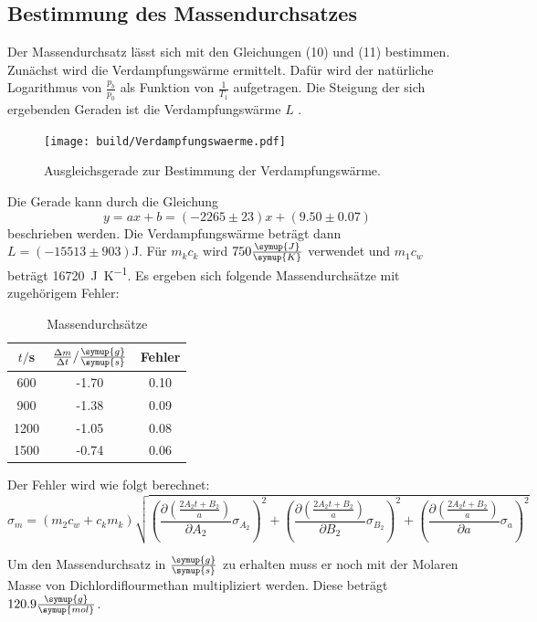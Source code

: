 \subsection{Bestimmung des Massendurchsatzes}
Der Massendurchsatz lässt sich mit den Gleichungen (10) und (11) bestimmen. Zunächst
wird die Verdampfungswärme ermittelt. Dafür wird der natürliche Logarithmus von
$\frac{p_b}{p_0}$ als Funktion von $\frac{1}{T_1}$ aufgetragen. Die Steigung der sich ergebenden
Geraden ist die Verdampfungswärme $L$ \cite{sample2}.
\begin{figure}[H]
  \centering
  \texttt{[image: build/Verdampfungswaerme.pdf]}
  \caption{Ausgleichsgerade zur Bestimmung der Verdampfungswärme.}
  \label{fig:Verdampfungswaerme}
\end{figure}
Die Gerade kann durch die Gleichung
\begin{equation}
  y = ax + b = (-2265 \pm 23)x + (9.50 \pm 0.07)
\end{equation}
beschrieben werden.
Die Verdampfungswärme beträgt dann $L = (-15513 \pm 903)$J.
Für $m_kc_k$ wird $750 \frac{\symup{J}}{\symup{K}}$ verwendet und $m_1c_w$ beträgt \SI{16720}{\joule\per\kelvin}.
Es ergeben sich folgende Massendurchsätze mit zugehörigem Fehler:
\begin{table}[H]
  \centering
  \caption{Massendurchsätze}
  \label{tab:Massendurchsätze}
  \begin{tabular}{c c c}
    \toprule
    $t/$s &$\frac{\Delta m}{\Delta t}/\frac{\symup{g}}{\symup{s}}$ & Fehler \\
    \midrule
      600 & -1.70 & 0.10 \\
      900 & -1.38 & 0.09 \\
     1200 & -1.05 & 0.08 \\
     1500 & -0.74 & 0.06 \\
    \bottomrule
  \end{tabular}
\end{table}

Der Fehler wird wie folgt berechnet:
\begin{equation}
  \sigma_m = (m_2c_w + c_km_k)\sqrt{
      \left( \frac{\partial \left(\frac{2A_2t + B_2}{a}\right)}{\partial A_2} \sigma_{A_2} \right)^{\!\! 2} +
      \left( \frac{\partial \left(\frac{2A_2t + B_2}{a}\right)}{\partial B_2} \sigma_{B_2} \right)^{\!\! 2} +
      \left( \frac{\partial \left(\frac{2A_2t + B_2}{a}\right)}{\partial a} \sigma_{a} \right)^{\!\! 2}
    }
\end{equation}

Um den Massendurchsatz in $\frac{\symup{g}}{\symup{s}}$ zu erhalten muss er noch
mit der Molaren Masse von Dichlordiflourmethan multipliziert werden.
Diese beträgt $120.9\frac{\symup{g}}{\symup{mol}}$.
